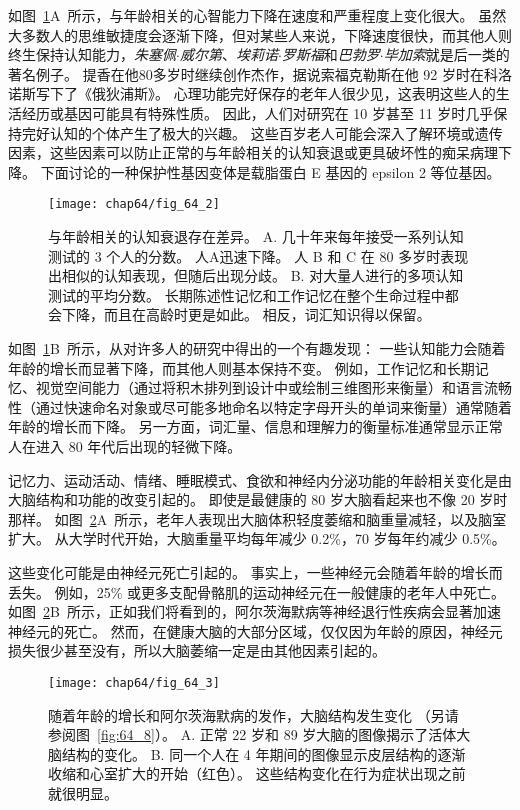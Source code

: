 如图~\ref{fig:64_2}A~所示，与年龄相关的心智能力下降在速度和严重程度上变化很大。
虽然大多数人的思维敏捷度会逐渐下降，但对某些人来说，下降速度很快，而其他人则终生保持认知能力，\textit{朱塞佩$\cdot$威尔第}、\textit{埃莉诺$\cdot$罗斯福}和\textit{巴勃罗$\cdot$毕加索}就是后一类的著名例子。
提香在他80多岁时继续创作杰作，据说索福克勒斯在他 92 岁时在科洛诺斯写下了《俄狄浦斯》。
心理功能完好保存的老年人很少见，这表明这些人的生活经历或基因可能具有特殊性质。
因此，人们对研究在 10 岁甚至 11 岁时几乎保持完好认知的个体产生了极大的兴趣。
这些百岁老人可能会深入了解环境或遗传因素，这些因素可以防止正常的与年龄相关的认知衰退或更具破坏性的痴呆病理下降。
下面讨论的一种保护性基因变体是载脂蛋白 E 基因的 epsilon 2 等位基因。


\begin{figure}[htbp]
	\centering
	\texttt{[image: chap64/fig\_64\_2]}
	\caption{与年龄相关的认知衰退存在差异。
		A. 几十年来每年接受一系列认知测试的 3 个人的分数。
		人A迅速下降。
		人 B 和 C 在 80 多岁时表现出相似的认知表现，但随后出现分歧\cite{rubin1998prospective}。
		B. 对大量人进行的多项认知测试的平均分数。
		长期陈述性记忆和工作记忆在整个生命过程中都会下降，而且在高龄时更是如此。
		相反，词汇知识得以保留\cite{park1996mediators}。}
	\label{fig:64_2}
\end{figure}


如图~\ref{fig:64_2}B~所示，从对许多人的研究中得出的一个有趣发现：
一些认知能力会随着年龄的增长而显著下降，而其他人则基本保持不变。
例如，工作记忆和长期记忆、视觉空间能力（通过将积木排列到设计中或绘制三维图形来衡量）和语言流畅性（通过快速命名对象或尽可能多地命名以特定字母开头的单词来衡量）通常随着年龄的增长而下降。
另一方面，词汇量、信息和理解力的衡量标准通常显示正常人在进入 80 年代后出现的轻微下降。


记忆力、运动活动、情绪、睡眠模式、食欲和神经内分泌功能的年龄相关变化是由大脑结构和功能的改变引起的。
即使是最健康的 80 岁大脑看起来也不像 20 岁时那样。
如图~\ref{fig:64_3}A~所示，老年人表现出大脑体积轻度萎缩和脑重量减轻，以及脑室扩大。
从大学时代开始，大脑重量平均每年减少 0.2\%，70 岁每年约减少 0.5\%。


这些变化可能是由神经元死亡引起的。
事实上，一些神经元会随着年龄的增长而丢失。
例如，25\% 或更多支配骨骼肌的运动神经元在一般健康的老年人中死亡。
如图~\ref{fig:64_3}B~所示，正如我们将看到的，阿尔茨海默病等神经退行性疾病会显著加速神经元的死亡。
然而，在健康大脑的大部分区域，仅仅因为年龄的原因，神经元损失很少甚至没有，所以大脑萎缩一定是由其他因素引起的。


\begin{figure}[htbp]
	\centering
	\texttt{[image: chap64/fig\_64\_3]}
	\caption{随着年龄的增长和阿尔茨海默病的发作，大脑结构发生变化
		（另请参阅图~\ref{fig:64_8}）。
		A. 正常 22 岁和 89 岁大脑的图像揭示了活体大脑结构的变化。
		B. 同一个人在 4 年期间的图像显示皮层结构的逐渐收缩和心室扩大的开始（红色）。
		这些结构变化在行为症状出现之前就很明显。}
	\label{fig:64_3}
\end{figure}


